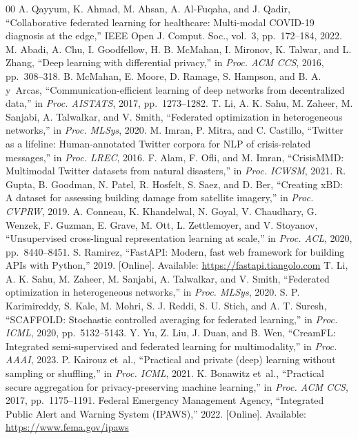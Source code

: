 \documentclass[conference]{IEEEtran}
\begin{document}
\begin{thebibliography}{00}
 A. Qayyum, K. Ahmad, M. Ahsan, A. Al-Fuqaha, and J. Qadir, ``Collaborative federated learning for healthcare: Multi-modal COVID-19 diagnosis at the edge,'' IEEE Open J. Comput. Soc., vol.~3, pp.~172--184, 2022.
 M. Abadi, A. Chu, I. Goodfellow, H. B. McMahan, I. Mironov, K. Talwar, and L. Zhang, ``Deep learning with differential privacy,'' in \emph{Proc. ACM CCS}, 2016, pp.~308--318.
 B. McMahan, E. Moore, D. Ramage, S. Hampson, and B. A. y~Arcas, ``Communication-efficient learning of deep networks from decentralized data,'' in \emph{Proc. AISTATS}, 2017, pp.~1273--1282.
 T. Li, A. K. Sahu, M. Zaheer, M. Sanjabi, A. Talwalkar, and V. Smith, ``Federated optimization in heterogeneous networks,'' in \emph{Proc. MLSys}, 2020.
 M. Imran, P. Mitra, and C. Castillo, ``Twitter as a lifeline: Human-annotated Twitter corpora for NLP of crisis-related messages,'' in \emph{Proc. LREC}, 2016.
 F. Alam, F. Ofli, and M. Imran, ``CrisisMMD: Multimodal Twitter datasets from natural disasters,'' in \emph{Proc. ICWSM}, 2021.
 R. Gupta, B. Goodman, N. Patel, R. Hosfelt, S. Saez, and D. Ber, ``Creating xBD: A dataset for assessing building damage from satellite imagery,'' in \emph{Proc. CVPRW}, 2019.
 A. Conneau, K. Khandelwal, N. Goyal, V. Chaudhary, G. Wenzek, F. Guzman, E. Grave, M. Ott, L. Zettlemoyer, and V. Stoyanov, ``Unsupervised cross-lingual representation learning at scale,'' in \emph{Proc. ACL}, 2020, pp.~8440--8451.
 S. Ramirez, ``FastAPI: Modern, fast web framework for building APIs with Python,'' 2019. [Online]. Available: \url{https://fastapi.tiangolo.com}
 T. Li, A. K. Sahu, M. Zaheer, M. Sanjabi, A. Talwalkar, and V. Smith, ``Federated optimization in heterogeneous networks,'' in \emph{Proc. MLSys}, 2020.
 S. P. Karimireddy, S. Kale, M. Mohri, S. J. Reddi, S. U. Stich, and A. T. Suresh, ``SCAFFOLD: Stochastic controlled averaging for federated learning,'' in \emph{Proc. ICML}, 2020, pp.~5132--5143.
 Y. Yu, Z. Liu, J. Duan, and B. Wen, ``CreamFL: Integrated semi-supervised and federated learning for multimodality,'' in \emph{Proc. AAAI}, 2023.
 P. Kairouz et~al., ``Practical and private (deep) learning without sampling or shuffling,'' in \emph{Proc. ICML}, 2021.
 K. Bonawitz et~al., ``Practical secure aggregation for privacy-preserving machine learning,'' in \emph{Proc. ACM CCS}, 2017, pp.~1175--1191.
 Federal Emergency Management Agency, ``Integrated Public Alert and Warning System (IPAWS),'' 2022. [Online]. Available: \url{https://www.fema.gov/ipaws}
\end{thebibliography}
\end{document}
